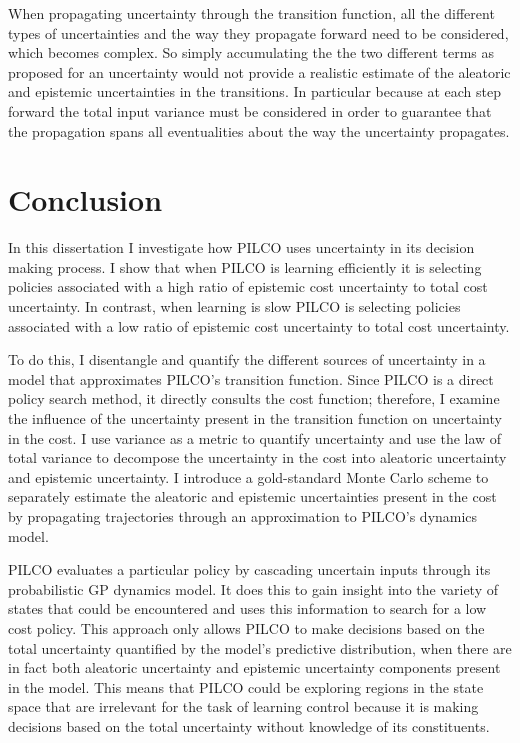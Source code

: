 When propagating uncertainty through the transition function, all the different types of uncertainties and the way they propagate forward need to be considered, which becomes complex. So simply accumulating the the two different terms as proposed for an uncertainty would not provide a realistic estimate of the aleatoric and epistemic uncertainties in the transitions. In particular because at each step forward the total input variance must be considered in order to guarantee that the propagation spans all eventualities about the way the uncertainty propagates.


\section{Conclusion}
\label{S:conclusions}
In this dissertation I investigate how PILCO uses uncertainty in its decision making process. I show that when PILCO is learning efficiently it is selecting policies associated with a high ratio of epistemic cost uncertainty to total cost uncertainty. In contrast, when learning is slow PILCO is selecting policies associated with a low ratio of epistemic cost uncertainty to total cost uncertainty. 

To do this, I disentangle and quantify the different sources of uncertainty in a model that approximates PILCO's transition function. Since PILCO is a direct policy search method, it directly consults the cost function; therefore, I examine the influence of the uncertainty present in the transition function on uncertainty in the cost. I use variance as a metric to quantify uncertainty and use the law of total variance to decompose the uncertainty in the cost into aleatoric uncertainty and epistemic uncertainty. I introduce a gold-standard Monte Carlo scheme to separately estimate the aleatoric and epistemic uncertainties present in the cost by propagating trajectories through an approximation to PILCO's dynamics model. 

PILCO evaluates a particular policy by cascading uncertain inputs through its probabilistic GP dynamics model. It does this to gain insight into the variety of states that could be encountered and uses this information to search for a low cost policy. This approach only allows PILCO to make decisions based on the total uncertainty quantified by the model's predictive distribution, when there are in fact both aleatoric uncertainty and epistemic uncertainty components present in the model. This means that PILCO could be exploring regions in the state space that are irrelevant for the task of learning control because it is making decisions based on the total uncertainty without knowledge of its constituents. 

